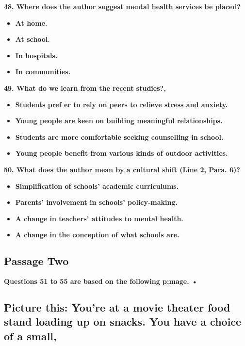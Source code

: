 \documentclass[UTF8,11pt]{ctexart}
\begin{document}
\textbf{48. Where does the author suggest mental health services be placed?}


\begin{itemize}[leftmargin=2em,itemsep=.2em,topsep=.4em]\item[A.] \textbf{At home.}
\item[B.] \textbf{At school.}
\item[C.] \textbf{In hospitals.}
\item[D.] \textbf{In communities.}
\end{itemize}

\textbf{49. What do we learn from the recent studies?,}


\begin{itemize}[leftmargin=2em,itemsep=.2em,topsep=.4em]\item[A.] \textbf{Students pref er to rely on peers to relieve stress and anxiety.}
\item[B.] \textbf{Young people are keen on building meaningful relationships.}
\item[C.] \textbf{Students are more comfortable seeking counselling in school.}
\item[D.] \textbf{Young people benefit from various kinds of outdoor activities.}
\end{itemize}

\textbf{50. What does the author mean by a cultural shift (Line 2, Para. 6)?}


\begin{itemize}[leftmargin=2em,itemsep=.2em,topsep=.4em]\item[A.] \textbf{Simplification of schools' academic curriculums.}
\item[B.] \textbf{Parents' involvement in schools' policy-making.}
\item[C.] \textbf{A change in teachers' attitudes to mental health.}
\item[D.] \textbf{A change in the conception of what schools are.}
\end{itemize}

\subsection*{\textbf{Passage Two}}


\textbf{Questions 51 to 55 are based on the following p;mage. •}


\subsection*{\textbf{Picture this: You're at a movie theater food stand loading up on snacks. You have a choice of }a \textbf{small,}}
\end{document}
